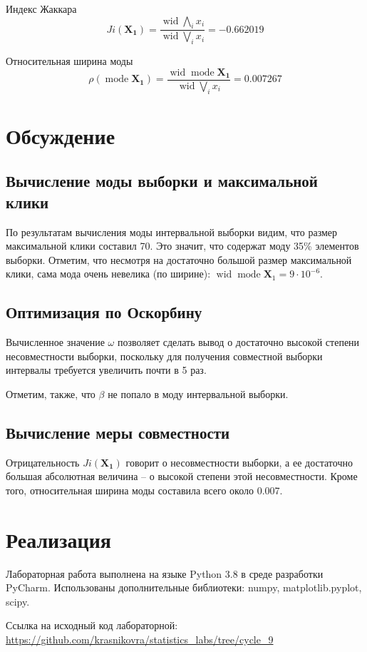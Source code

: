 \documentclass[12pt]{article}
\DeclareMathOperator{\wid}{wid}
\DeclareMathOperator{\mode}{mode}
\begin{document}
	Индекс Жаккара
	\begin{equation*}
		Ji(\mathbf{X_1}) = \dfrac{\wid \bigwedge\limits_i x_i}{\wid \bigvee\limits_i x_i} = -0.662019
	\end{equation*}
	
	Относительная ширина моды
	\begin{equation*}
		\rho(\mode\mathbf{X_1}) = \dfrac{\wid \mode\mathbf{X_1}}{\wid \bigvee\limits_i x_i} = 0.007267
	\end{equation*}
	
	\section{Обсуждение}
	
	\subsection{Вычисление моды выборки и максимальной клики}
	
	По результатам вычисления моды интервальной выборки видим, что размер максимальной клики составил 70. Это значит, что содержат моду 35\% элементов выборки. Отметим, что несмотря на достаточно большой размер максимальной клики, сама мода очень невелика (по ширине): $\wid\mode\mathbf{X}_1 = 9 \cdot 10^{-6}$.
	
	\subsection{Оптимизация по Оскорбину}
	
	Вычисленное значение $\omega$ позволяет сделать вывод о достаточно высокой степени несовместности выборки, поскольку для получения совместной выборки интервалы требуется увеличить почти в 5 раз.
	
	Отметим, также, что $\beta$ не попало в моду интервальной выборки.
	
	\subsection{Вычисление меры совместности}
	
	Отрицательность $Ji(\mathbf{X_1})$ говорит о несовместности выборки, а ее достаточно большая абсолютная величина -- о высокой степени этой несовместности. Кроме того, относительная ширина моды составила всего около 0.007.
	
	\section{Реализация}
	
	Лабораторная работа выполнена на языке Python 3.8 в среде разработки PyCharm. Использованы дополнительные библиотеки: numpy, matplotlib.pyplot, scipy.
	
	Ссылка на исходный код лабораторной: \url{https://github.com/krasnikovra/statistics_labs/tree/cycle_9}
	
\end{document}
